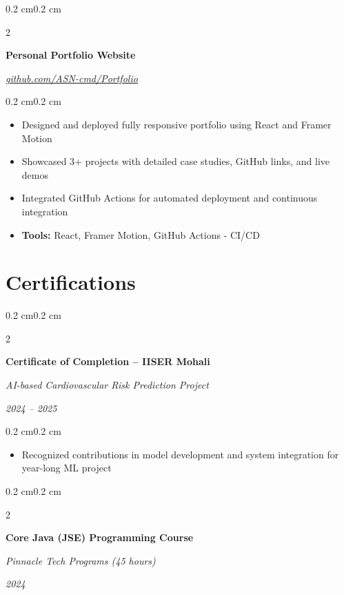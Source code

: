 \documentclass[10pt, letterpaper]{article}
\newenvironment{highlights}{
    \begin{itemize}[
        topsep=0.10 cm,
        parsep=0.10 cm,
        partopsep=0pt,
        itemsep=0pt,
        leftmargin=0.4 cm + 10pt
    ]
}{\end{itemize}}
\newenvironment{onecolentry}{
    \begin{adjustwidth}{0.2 cm}{0.2 cm}
}{\end{adjustwidth}}
\newenvironment{twocolentry}[2][]{
    \onecolentry
    \def\secondColumn{#2}
    \setcolumnwidth{\fill, 4.5 cm}
    \begin{paracol}{2}
}{
    \switchcolumn \raggedleft \secondColumn
    \end{paracol}
    \endonecolentry
}
\begin{document}
    \vspace{0.2 cm}

    \begin{twocolentry}{
        \textit{\href{https://github.com/ASN-cmd/Portfolio}{github.com/ASN-cmd/Portfolio}}
    }
        \textbf{Personal Portfolio Website}
    \end{twocolentry}
    
    \vspace{0.10 cm}
    \begin{onecolentry}
        \begin{highlights}
            \item Designed and deployed fully responsive portfolio using React and Framer Motion
            \item Showcased 3+ projects with detailed case studies, GitHub links, and live demos
            \item Integrated GitHub Actions for automated deployment and continuous integration
            \item \textbf{Tools:} React, Framer Motion, GitHub Actions - CI/CD
        \end{highlights}
    \end{onecolentry}

    \section{Certifications}
    
    \begin{twocolentry}{
        \textit{2024 -- 2025}
    }
        \textbf{Certificate of Completion -- IISER Mohali}
        
        \textit{AI-based Cardiovascular Risk Prediction Project}
    \end{twocolentry}
    
    \vspace{0.10 cm}
    \begin{onecolentry}
        \begin{highlights}
            \item Recognized contributions in model development and system integration for year-long ML project
        \end{highlights}
    \end{onecolentry}

    \vspace{0.2 cm}

    \begin{twocolentry}{
        \textit{2024}
    }
        \textbf{Core Java (JSE) Programming Course}
        
        \textit{Pinnacle Tech Programs (45 hours)}
    \end{twocolentry}
\end{document}
